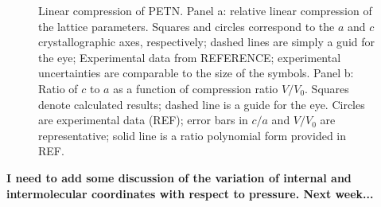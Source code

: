 \documentclass[prb,aps,nobibnotes,twocolumn,doublespace,twocolumngrid,superbib]{revtex4}
\begin{document}
\begin{figure}
\caption{Linear compression of PETN.  Panel a: relative linear compression
of the lattice parameters. Squares and circles correspond to the $a$ and $c$ 
crystallographic axes, respectively; dashed lines are simply a guid for
the eye; Experimental data from REFERENCE; experimental uncertainties
are comparable to the size of the symbols. Panel b: Ratio of $c$ to $a$ as
a function of compression ratio $V/V_0$.  Squares denote calculated results;
dashed line is a guide for the eye.  Circles are experimental data (REF);
error bars in $c/a$ and $V/V_0$ are representative; solid line is a 
ratio polynomial form provided in REF.}
\label{fig:linear_compress}
\end{figure}


{\bf I need to add some discussion of the variation of internal
and intermolecular coordinates with respect to pressure.  Next
week...}
\end{document}
